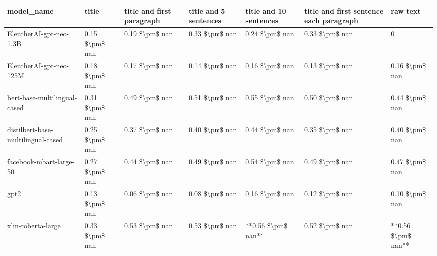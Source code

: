 \begin{tabular}{lllllll}
\toprule
                        model\_name &          title & title and first paragraph & title and 5 sentences & title and 10 sentences & title and first sentence each paragraph &           raw text \\
\midrule
           EleutherAI-gpt-neo-1.3B & 0.15 \$\textbackslash pm\$ nan &            0.19 \$\textbackslash pm\$ nan &        0.33 \$\textbackslash pm\$ nan &         0.24 \$\textbackslash pm\$ nan &                          0.33 \$\textbackslash pm\$ nan &                  0 \\
           EleutherAI-gpt-neo-125M & 0.18 \$\textbackslash pm\$ nan &            0.17 \$\textbackslash pm\$ nan &        0.14 \$\textbackslash pm\$ nan &         0.16 \$\textbackslash pm\$ nan &                          0.13 \$\textbackslash pm\$ nan &     0.16 \$\textbackslash pm\$ nan \\
      bert-base-multilingual-cased & 0.31 \$\textbackslash pm\$ nan &            0.49 \$\textbackslash pm\$ nan &        0.51 \$\textbackslash pm\$ nan &         0.55 \$\textbackslash pm\$ nan &                          0.50 \$\textbackslash pm\$ nan &     0.44 \$\textbackslash pm\$ nan \\
distilbert-base-multilingual-cased & 0.25 \$\textbackslash pm\$ nan &            0.37 \$\textbackslash pm\$ nan &        0.40 \$\textbackslash pm\$ nan &         0.44 \$\textbackslash pm\$ nan &                          0.35 \$\textbackslash pm\$ nan &     0.40 \$\textbackslash pm\$ nan \\
           facebook-mbart-large-50 & 0.27 \$\textbackslash pm\$ nan &            0.44 \$\textbackslash pm\$ nan &        0.49 \$\textbackslash pm\$ nan &         0.54 \$\textbackslash pm\$ nan &                          0.49 \$\textbackslash pm\$ nan &     0.47 \$\textbackslash pm\$ nan \\
                              gpt2 & 0.13 \$\textbackslash pm\$ nan &            0.06 \$\textbackslash pm\$ nan &        0.08 \$\textbackslash pm\$ nan &         0.16 \$\textbackslash pm\$ nan &                          0.12 \$\textbackslash pm\$ nan &     0.10 \$\textbackslash pm\$ nan \\
                 xlm-roberta-large & 0.33 \$\textbackslash pm\$ nan &            0.53 \$\textbackslash pm\$ nan &        0.53 \$\textbackslash pm\$ nan &     **0.56 \$\textbackslash pm\$ nan** &                          0.52 \$\textbackslash pm\$ nan & **0.56 \$\textbackslash pm\$ nan** \\
\bottomrule
\end{tabular}
